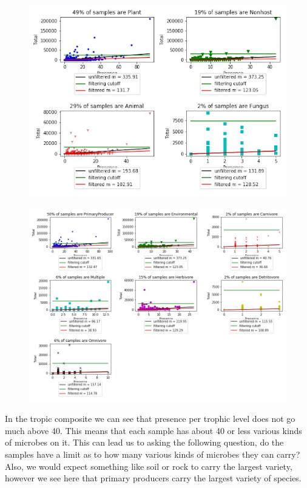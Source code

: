 \documentclass{article}
\theoremstyle{definition} \newtheorem*{lte}{Definition}
\theoremstyle{plain} \newtheorem*{csbt}{Theorem}
\begin{document}
\begin{figure}[H]
\begin{subfloat}{
  \includegraphics[width=.45\linewidth]{host.png}
  \label{fig:host}}
\end{subfloat}
\hspace{.1cm}
\begin{subfloat}{
  \includegraphics[width=.45\linewidth]{trophic.png}
  \label{fig:trophic}}
  \end{subfloat}
  \caption{}
\end{figure}

In the tropic composite we can see that presence per trophic level does not go much above 40. This means that each sample has about 40 or less various kinds of microbes on it. This can lead us to asking the following question, do the samples have a limit as to how many various kinds of microbes they can carry? Also, we would expect something like soil or rock to carry the largest variety, however we see here that primary producers carry the largest variety of species. 
\end{document}
